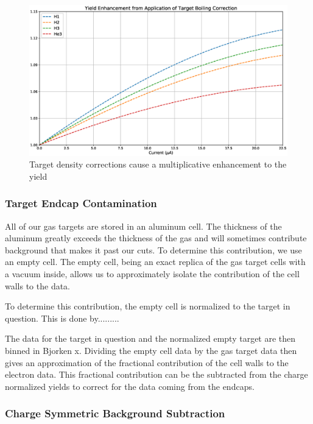 \begin{figure}
	\includegraphics[width=\textwidth]{./chap3-analysis/fig/boil_yield_cor.eps}
	\caption{Target density corrections cause a multiplicative enhancement to the yield}
	\label{fig:boilyieldcor}
\end{figure}

\subsubsection{Target Endcap Contamination}

All of our gas targets are stored in an aluminum cell. The thickness of the aluminum greatly exceeds the thickness of the gas and will sometimes contribute background that makes it past our cuts. To determine this contribution, we use an empty cell. The empty cell, being an exact replica of the gas target cells with a vacuum inside, allows us to approximately isolate the contribution of the cell walls to the data.

To determine this contribution, the empty cell is normalized to the target in question. This is done by.........

The data for the target in question and the normalized empty target are then binned in Bjorken x. Dividing the empty cell data by the gas target data then gives an approximation of the fractional contribution of the cell walls to the electron data. This fractional contribution can be the subtracted from the charge normalized yields to correct for the data coming from the endcaps.

\subsubsection{Charge Symmetric Background Subtraction}

